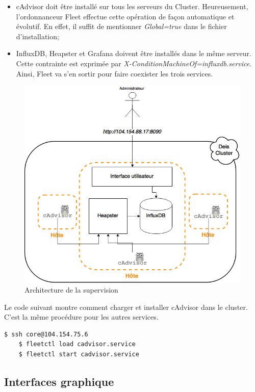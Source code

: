 \begin{onehalfspace}
\begin{itemize}
	\item cAdvisor doit être installé sur tous les serveurs du Cluster. Heureusement, l'ordonnanceur Fleet effectue cette opération de façon automatique et évolutif. En effet, il suffit de mentionner \emph{Global=true} dans le fichier d'installation;
	\item InfluxDB, Heapster et Grafana doivent être installés dans le même serveur. Cette contrainte est exprimée par \emph{X-ConditionMachineOf=influxdb.service}. Ainsi, Fleet va s'en sortir pour faire coexister les trois services.
\end{itemize}

\begin{figure}[H]
\centering
\includegraphics [scale=0.6]{chapitre5/assets/monitoring-cluster}
\caption{Architecture de la supervision}
\label{fig:}
\end{figure}

Le code suivant montre comment charger et installer cAdvisor dans le cluster. C'est la même procédure pour les autres services.

\begin{lstlisting}[language=bash,caption=Lancement du service cAdvisor]
	$ ssh core@104.154.75.6 
	$ fleetctl load cadvisor.service
	$ fleetctl start cadvisor.service
\end{lstlisting}


\subsection{Interfaces graphique}


\end{onehalfspace}
